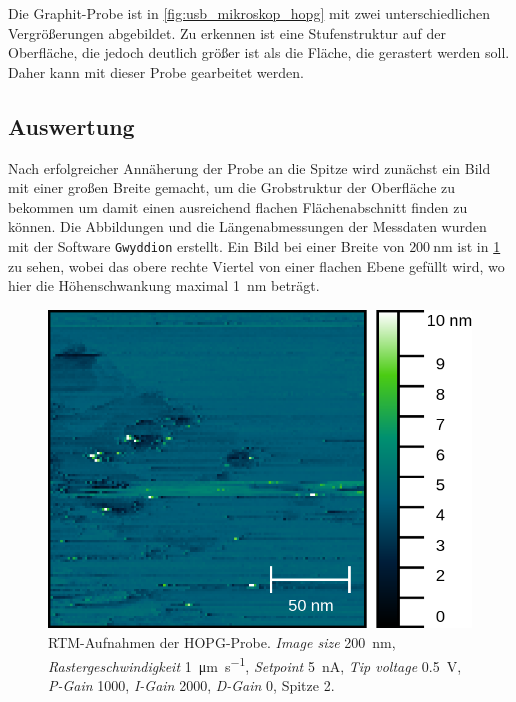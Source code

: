 Die Graphit-Probe ist in \cref{fig:usb_mikroskop_hopg} mit zwei unterschiedlichen
Vergrößerungen abgebildet. Zu erkennen ist eine Stufenstruktur auf der Oberfläche, die jedoch
deutlich größer ist als die Fläche, die gerastert werden soll. Daher kann mit dieser
Probe gearbeitet werden.



\subsection*{Auswertung}

Nach erfolgreicher Annäherung der Probe an die Spitze wird zunächst ein Bild
mit einer großen Breite gemacht, um die Grobstruktur der Oberfläche
zu bekommen um damit einen ausreichend flachen Flächenabschnitt
finden zu können. Die Abbildungen und die Längenabmessungen der Messdaten wurden 
mit der Software \verb|Gwyddion| erstellt. Ein Bild bei einer Breite von $\SI{200}{\nm}$ ist in
\cref{fig:hopg_rtm_weitaufnahme} zu sehen, wobei das obere rechte Viertel
von einer flachen Ebene gefüllt wird, wo hier die Höhenschwankung maximal \SI{1}{\nm} beträgt.

\begin{figure}[htb]
	\centering
	\includegraphics[width=0.6\linewidth]{figs/HOPG10558.png}
	\caption{RTM-Aufnahmen der HOPG-Probe. \textit{Image size} \SI{200}{\nano \meter},
		\textit{Rastergeschwindigkeit} \SI{1}{\micro\m\per \second}, \textit{Setpoint} \SI{5}{\nano \ampere},
		\textit{Tip voltage} \SI{0.5}{\volt}, \textit{P-Gain} \num{1000}, \textit{I-Gain} \num{2000},
		\textit{D-Gain} \num{0}, Spitze 2.}
	\label{fig:hopg_rtm_weitaufnahme}
\end{figure}

